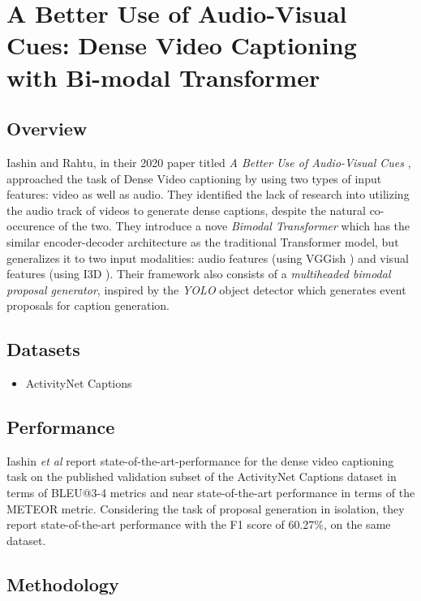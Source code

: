 \section{A Better Use of Audio-Visual Cues: Dense Video Captioning with Bi-modal Transformer}

\subsection{Overview}

\par Iashin and Rahtu, in their 2020 paper titled \textit{A Better Use of Audio-Visual Cues} \cite{iashin2020better},
approached the task of Dense Video captioning by using two types of input features: video as well as
audio. They identified the lack of research into utilizing the audio track of videos to generate
dense captions, despite the natural co-occurence of the two. They introduce a nove \textit{Bimodal
Transformer} which has the similar encoder-decoder architecture as the traditional Transformer model, 
but generalizes it to two input modalities:  audio features (using VGGish \cite{vggish}) and visual 
features (using I3D \cite{carreira2018quo}). Their  framework also consists of a \textit{multiheaded bimodal 
proposal generator}, inspired by the \textit{YOLO} object detector \cite{yolo} which generates event 
proposals for caption generation.


\subsection{Datasets}
\begin{itemize}
\item ActivityNet Captions \cite{krishna2017densecaptioning}
\end{itemize}

\subsection{Performance}
\par Iashin \textit{et al} report state-of-the-art-performance for the dense video captioning 
task on the published validation subset of the ActivityNet Captions dataset in terms of BLEU@3-4 
metrics and near state-of-the-art performance in terms of the METEOR metric. Considering the 
task of proposal generation in isolation, they report state-of-the-art performance with the F1 
score of 60.27\%, on the same dataset.


\subsection{Methodology}

